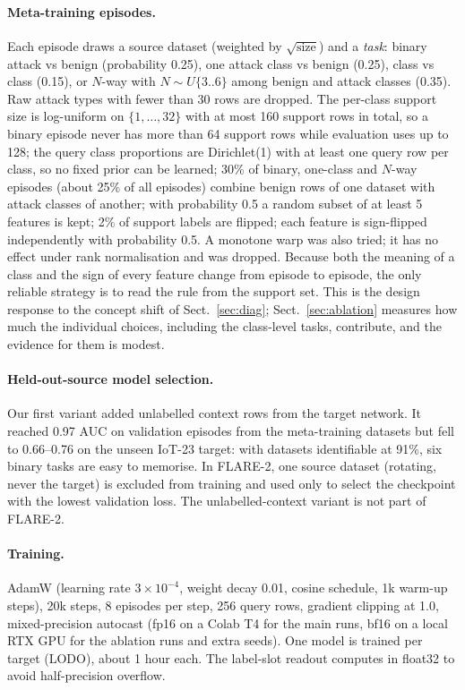 \documentclass[11pt]{article}
\begin{document}
\paragraph{Meta-training episodes.}
Each episode draws a source dataset (weighted by $\sqrt{\text{size}}$) and a \emph{task}: binary attack vs benign (probability 0.25), one attack class vs benign (0.25), class vs class (0.15), or $N$-way with $N\sim U\{3..6\}$ among benign and attack classes (0.35).
Raw attack types with fewer than 30 rows are dropped.
The per-class support size is log-uniform on $\{1,\dots,32\}$ with at most 160 support rows in total, so a binary episode never has more than 64 support rows while evaluation uses up to 128; the query class proportions are Dirichlet(1) with at least one query row per class, so no fixed prior can be learned; 30\% of binary, one-class and $N$-way episodes (about 25\% of all episodes) combine benign rows of one dataset with attack classes of another; with probability 0.5 a random subset of at least 5 features is kept; 2\% of support labels are flipped; each feature is sign-flipped independently with probability 0.5.
A monotone warp was also tried; it has no effect under rank normalisation and was dropped.
Because both the meaning of a class and the sign of every feature change from episode to episode, the only reliable strategy is to read the rule from the support set.
This is the design response to the concept shift of Sect.~\ref{sec:diag}; Sect.~\ref{sec:ablation} measures how much the individual choices, including the class-level tasks, contribute, and the evidence for them is modest.

\paragraph{Held-out-source model selection.}
Our first variant added unlabelled context rows from the target network.
It reached 0.97 AUC on validation episodes from the meta-training datasets but fell to 0.66--0.76 on the unseen IoT-23 target: with datasets identifiable at 91\%, six binary tasks are easy to memorise.
In FLARE-2, one source dataset (rotating, never the target) is excluded from training and used only to select the checkpoint with the lowest validation loss.
The unlabelled-context variant is not part of FLARE-2.

\paragraph{Training.}
AdamW (learning rate $3\times10^{-4}$, weight decay 0.01, cosine schedule, 1k warm-up steps), 20k steps, 8 episodes per step, 256 query rows, gradient clipping at 1.0, mixed-precision autocast (fp16 on a Colab T4 for the main runs, bf16 on a local RTX GPU for the ablation runs and extra seeds).
One model is trained per target (LODO), about 1 hour each.
The label-slot readout computes in float32 to avoid half-precision overflow.
\end{document}
